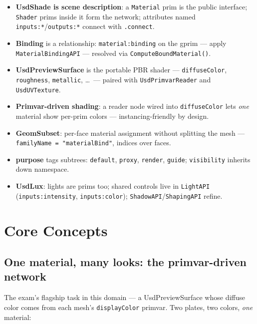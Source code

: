 \CheatSheetTitle
\begin{itemize}[leftmargin=*]
  \item \textbf{UsdShade is scene description}: a \texttt{Material} prim is
        the public interface; \texttt{Shader} prims inside it form the
        network; attributes named \texttt{inputs:*}/\texttt{outputs:*}
        connect with \texttt{.connect}.
  \item \textbf{Binding} is a relationship: \texttt{material:binding} on the
        gprim --- apply \texttt{MaterialBindingAPI} --- resolved via
        \texttt{ComputeBoundMaterial()}.
  \item \textbf{UsdPreviewSurface} is the portable PBR shader ---
        \texttt{diffuseColor}, \texttt{roughness}, \texttt{metallic},
        \ldots\ --- paired with \texttt{UsdPrimvarReader} and
        \texttt{UsdUVTexture}.
  \item \textbf{Primvar-driven shading}: a reader node wired into
        \texttt{diffuseColor} lets \emph{one} material show per-prim colors
        --- instancing-friendly by design.
  \item \textbf{GeomSubset}: per-face material assignment without splitting
        the mesh --- \texttt{familyName = "materialBind"}, indices over
        faces.
  \item \textbf{purpose} tags subtrees: \texttt{default}, \texttt{proxy},
        \texttt{render}, \texttt{guide}; \texttt{visibility} inherits down
        namespace.
  \item \textbf{UsdLux}: lights are prims too; shared controls live in
        \texttt{LightAPI} (\texttt{inputs:intensity},
        \texttt{inputs:color}); \texttt{ShadowAPI}/\texttt{ShapingAPI}
        refine.
\end{itemize}

\section{Core Concepts}

\subsection{One material, many looks: the primvar-driven network}\label{sec:vis-net}
The exam's flagship task in this domain --- a UsdPreviewSurface whose diffuse
color comes from each mesh's \texttt{displayColor} primvar. Two plates, two
colors, \emph{one} material:

